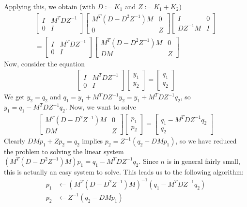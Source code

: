 \documentclass{article}
\begin{document}
Applying this, we obtain (with $D := K_1$ and $Z := K_1 + K_2$)
\begin{align}
		\begin{bmatrix}
				I & M^T DZ^{-1}\\
				0 & I
		\end{bmatrix}
		\begin{bmatrix}
				M^T(D - D^2Z^{-1})M & 0\\
				0 & Z
		\end{bmatrix}
		\begin{bmatrix}
				I & 0\\
				DZ^{-1} M & I
		\end{bmatrix}\\
		= 
		\begin{bmatrix}
				I & M^T DZ^{-1}\\
				0 & I
		\end{bmatrix}
		\begin{bmatrix}
			M^T(D-D^2Z^{-1})M & 0\\
			DM & Z
		\end{bmatrix}
\end{align}
Now, consider the equation
\begin{align}
		\begin{bmatrix}
				I & M^T DZ^{-1}\\
				0 & I
		\end{bmatrix}
		\begin{bmatrix}
			y_1\\
			y_2
		\end{bmatrix}
		=
		\begin{bmatrix}
			q_1\\
			q_2
		\end{bmatrix}
\end{align}
We get $y_2 = q_2$ and $q_1 = y_1 + M^TDZ^{-1} y_2 = y_1 + M^TDZ^{-1} q_2$, so $y_1 = q_1 - M^TDZ^{-1}q_2$. Now, we want to solve
\begin{align}
		\begin{bmatrix}
			M^T(D-D^2Z^{-1})M & 0\\
			DM & Z
		\end{bmatrix}
		\begin{bmatrix}
			p_1\\
			p_2
		\end{bmatrix}
		=
		\begin{bmatrix}
			q_1 - M^TDZ^{-1}q_2\\
			q_2
		\end{bmatrix}
\end{align}
Clearly $DM p_1 + Zp_2 = q_2$ implies $p_2 = Z^{-1}(q_2 - DMp_1)$, so we have reduced the problem to solving the linear system $(M^T(D-D^2Z^{-1})M)p_1 = q_1 - M^TDZ^{-1}q_2$. Since $n$ is in general fairly small, this is actually an easy system to solve. This leads us to the following algorithm:
\begin{align}
	p_1 &\leftarrow (M^T(D-D^2Z^{-1})M)^{-1}(q_1 - M^TDZ^{-1}q_2)\\
	p_2 &\leftarrow Z^{-1}(q_2 - DMp_1)
\end{align}
\end{document}
